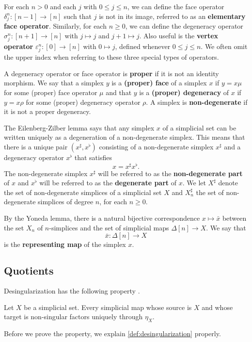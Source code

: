 For each $n>0$ and each $j$ with $0\leq j\leq n$, we can define the face operator $\delta ^n_j:[n-1]\to [n]$ such that $j$ is not in its image, referred to as an \textbf{elementary face operator}. Similarly, for each $n\geq 0$, we can define the degeneracy operator $\sigma ^n_j:[n+1]\to [n]$ with $j\mapsto j$ and $j+1\mapsto j$. Also useful is the \textbf{vertex operator} $\varepsilon ^n_j:[0]\to [n]$ with $0\mapsto j$, defined whenever $0\leq j\leq n$. We often omit the upper index when referring to these three special types of operators.

A degeneracy operator or face operator is \textbf{proper} if it is not an identity morphism. We say that a simplex $y$ is a \textbf{(proper) face} of a simplex $x$ if $y=x\mu$ for some (proper) face operator $\mu$ and that $y$ is a \textbf{(proper) degeneracy} of $x$ if $y=x\rho$ for some (proper) degeneracy operator $\rho$. A simplex is \textbf{non-degenerate} if it is not a proper degeneracy. 

The Eilenberg-Zilber lemma \cite[Thm.~4.2.3]{FP90} says that any simplex $x$ of a simplicial set can be written uniquely as a degeneration of a non-degenerate simplex. This means that there is a unique pair $(x^\sharp ,x^\flat )$ consisting of a non-degenerate simplex $x^\sharp$ and a degeneracy operator $x^\flat$ that satisfies
\[x=x^\sharp x^\flat.\]
The non-degenerate simplex $x^\sharp$ will be referred to as the \textbf{non-degenerate part} of $x$ and $x^\flat$ will be referred to as the \textbf{degenerate part} of $x$. We let $X^\sharp$ denote the set of non-degenerate simplices of a simplicial set $X$ and $X^\sharp _n$ the set of non-degenerate simplices of degree $n$, for each $n\geq 0$.

By the Yoneda lemma, there is a natural bijective correspondence $x\mapsto \bar{x}$ between the set $X_n$ of $n$-simplices and the set of simplicial maps $\Delta [n]\to X$. We say that
\[\bar{x}:\Delta [n]\to X\]
is the \textbf{representing map} of the simplex $x$.


\subsection{Quotients}

Desingularization has the following property \cite[Rem.~2.2.12]{WJR13}.
\begin{lemma}\label{lem:desing_unique_factorization_through_unit}
Let $X$ be a simplicial set. Every simplicial map whose source is $X$ and whose target is non-singular factors uniquely through $\eta _X$.
\end{lemma}
\noindent Before we prove the property, we explain \cref{def:desingularization} properly.


